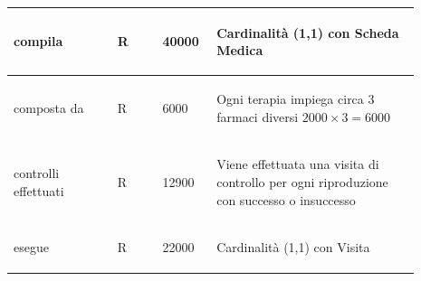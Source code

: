 \documentclass[12pt,a4paper]{article}
\begin{document}
\begin{center}
\begin{longtable}{|p{0.23\linewidth}|p{0.1\linewidth}|p{0.11\linewidth}|p{0.45\linewidth}|}
\hline
compila
 & 
\begin{center}\vspace{-25pt}R\end{center}
 & 
\begin{center}\vspace{-25pt}40000\end{center}
 & 
\begin{flushleft}\vspace{-25pt}Cardinalità (1,1) con Scheda Medica\end{flushleft}
\\

\hline
composta da
 & 
\begin{center}\vspace{-25pt}R\end{center}
 & 
\begin{center}\vspace{-25pt}6000\end{center}
 & 
\begin{flushleft}\vspace{-25pt}Ogni terapia impiega circa 3 farmaci diversi $2000\times 3 = 6000$\end{flushleft}
\\

\hline
controlli effettuati
 & 
\begin{center}\vspace{-25pt}R\end{center}
 & 
\begin{center}\vspace{-25pt}12900\end{center}
 & 
\begin{flushleft}\vspace{-25pt}Viene effettuata una visita di controllo per ogni riproduzione con successo o insuccesso  \end{flushleft}
\\

\hline
esegue
 & 
\begin{center}\vspace{-25pt}R\end{center}
 & 
\begin{center}\vspace{-25pt}22000\end{center}
 & 
\begin{flushleft}\vspace{-25pt}Cardinalità (1,1) con Visita\end{flushleft}
\\


\end{longtable}
\end{center}
\end{document}
